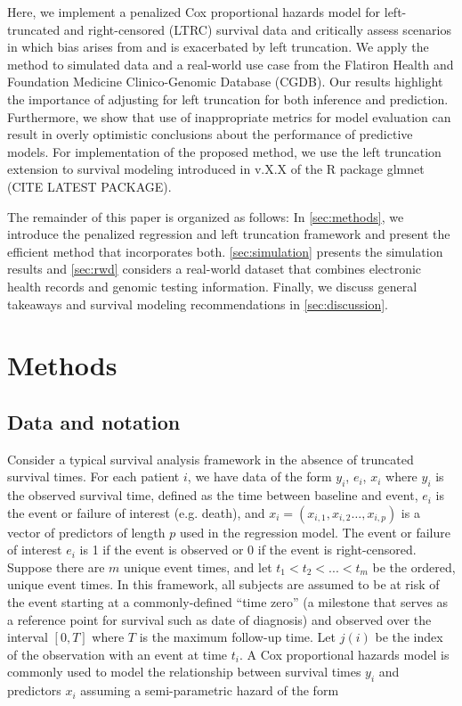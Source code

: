\documentclass[11pt,final,fleqn]{article}\usepackage[]{graphicx}\usepackage[]{color}
\theoremstyle{plain}
\newcommand{\pkg}[1]{{\fontseries{b}\selectfont #1}}
\begin{document}
Here, we implement a penalized Cox proportional hazards model for left-truncated and right-censored (LTRC) survival data and critically assess scenarios in which bias arises from and is exacerbated by left truncation. We apply the method to simulated data and a real-world use case from the Flatiron Health and Foundation Medicine Clinico-Genomic Database (CGDB). Our results highlight the importance of adjusting for left truncation for both inference and prediction. Furthermore, we show that use of inappropriate metrics for model evaluation can result in overly optimistic conclusions about the performance of predictive models. For implementation of the proposed method, we use the left truncation extension to survival modeling introduced in v.X.X of the \textsf{R} package \pkg{glmnet} (CITE LATEST PACKAGE). 

The remainder of this paper is organized as follows: In \autoref{sec:methods}, we introduce the penalized regression and left truncation framework and present the efficient method that incorporates both. \autoref{sec:simulation} presents the simulation results and \autoref{sec:rwd} considers a real-world dataset that combines electronic health records and genomic testing information. Finally, we discuss general takeaways and survival modeling recommendations in \autoref{sec:discussion}. 

\section{Methods} \label{sec:methods}

\subsection{Data and notation} 
Consider a typical survival analysis framework in the absence of truncated survival times. For each patient $i$, we have data of the form $y_i$, $e_i$, $x_i$ where $y_i$ is the observed survival time, defined as the time between baseline and event, $e_i$ is the event or failure of interest (e.g. death), and $x_i = (x_{i,1}, x_{i,2} \ldots, x_{i,p})$ is a vector of predictors of length $p$ used in the regression model. The event or failure of interest $e_i$ is 1 if the event is observed or 0 if the event is right-censored. Suppose there are $m$ unique event times, and let $t_1 < t_2 < ... < t_m$ be the ordered, unique event times. In this framework, all subjects are assumed to be at risk of the event starting at a commonly-defined ``time zero'' (a milestone that serves as a reference point for survival such as date of diagnosis) and observed over the interval $[0,T]$ where $T$ is the maximum follow-up time. Let $j(i)$ be the index of the observation with an event at time $t_i$. A Cox proportional hazards model is commonly used to model the relationship between survival times $y_i$ and predictors $x_i$ assuming a semi-parametric hazard of the form
\end{document}
